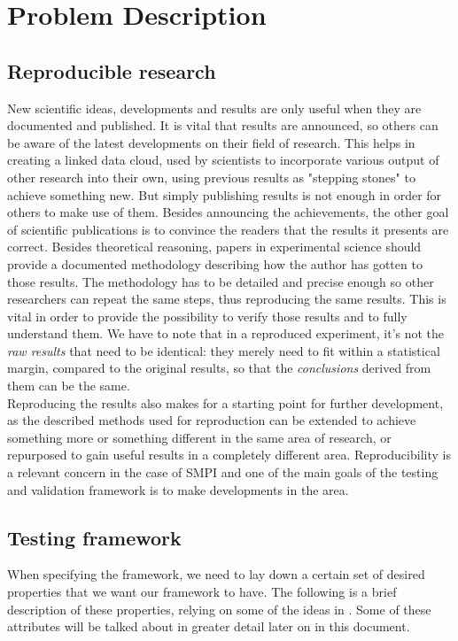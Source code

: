 
\chapter{Problem Description}
\label{Chapter3}

\section{Reproducible research}
New scientific ideas, developments and results are only useful when
they are documented and published. It is vital that results are
announced, so others can be aware of the latest developments on their
field of research. This helps in creating a linked data cloud, used by
scientists to incorporate various output of other research into their
own, using previous results as "stepping stones" to achieve something
new.\cite{babbccrddg10} But simply publishing results is not enough in
order for others to make use of them. Besides announcing the
achievements, the other goal of scientific publications is to convince
the readers that the results it presents are correct. Besides
theoretical reasoning, papers in experimental science should provide a
documented methodology describing how the author has gotten to those
results.\cite{m10} The methodology has to be detailed and precise
enough so other researchers can repeat the same steps, thus
reproducing the same results. This is vital in order to provide the
possibility to verify those results and to fully understand
them. We have to note that in a reproduced experiment, it's not the
\emph{raw results} that need to be identical: they merely need to fit
within a statistical margin, compared to the original results, so that
the \emph{conclusions} derived from them can be the same.\\
Reproducing the results also makes for a starting point for
further development, as the described methods used for reproduction
can be extended to achieve something more or something different in
the same area of research, or repurposed to gain useful results in a
completely different area. Reproducibility is a relevant concern in
the case of SMPI and one of the main goals of the testing and
validation framework is to make developments in the area.
\section{Testing framework}
When specifying the framework, we need to lay down a certain
set of desired properties that we want our framework to have. The
following is a brief description of these properties, relying on some
of the ideas in \cite{bn12_1}. Some of these attributes will be talked
about in greater detail later on in this document.
